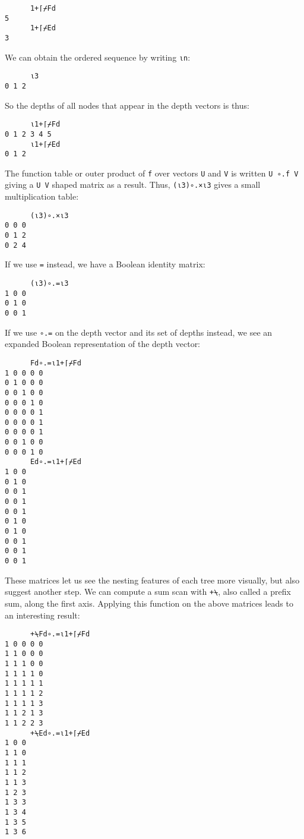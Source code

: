 \documentclass[numbers,preprint]{sigplanconf}
\begin{document}
\begin{verbatim}
      1+⌈⌿Fd
5
      1+⌈⌿Ed
3
\end{verbatim}

We can obtain the ordered sequence  by writing \verb;⍳n;:

\begin{verbatim}
      ⍳3
0 1 2
\end{verbatim}

So the depths of all nodes that appear in the depth vectors is thus:

\begin{verbatim}
      ⍳1+⌈⌿Fd
0 1 2 3 4 5
      ⍳1+⌈⌿Ed
0 1 2
\end{verbatim}

The function table or outer product of \verb;f; over vectors \verb;U; and \verb;V; is
written \verb;U ∘.f V; giving a \verb;U V; shaped matrix as a result. Thus,
\verb;(⍳3)∘.×⍳3; gives a small multiplication table:

\begin{verbatim}
      (⍳3)∘.×⍳3
0 0 0
0 1 2
0 2 4
\end{verbatim}

If we use \verb;=; instead, we have a Boolean identity matrix:

\begin{verbatim}
      (⍳3)∘.=⍳3
1 0 0
0 1 0
0 0 1
\end{verbatim}

If we use \verb;∘.=; on the depth vector and its set of depths instead,
we see an expanded Boolean representation of the depth vector:

\begin{verbatim}
      Fd∘.=⍳1+⌈⌿Fd
1 0 0 0 0
0 1 0 0 0
0 0 1 0 0
0 0 0 1 0
0 0 0 0 1
0 0 0 0 1
0 0 0 0 1
0 0 1 0 0
0 0 0 1 0
      Ed∘.=⍳1+⌈⌿Ed
1 0 0
0 1 0
0 0 1
0 0 1
0 0 1
0 1 0
0 1 0
0 0 1
0 0 1
0 0 1
\end{verbatim}

These matrices let us see the nesting features of each tree more
visually, but also suggest another step. We can compute a sum scan
with \verb;+⍀;, also called a prefix sum, along the first axis. Applying
this function on the above matrices leads to an interesting result:

\begin{verbatim}
      +⍀Fd∘.=⍳1+⌈⌿Fd
1 0 0 0 0
1 1 0 0 0
1 1 1 0 0
1 1 1 1 0
1 1 1 1 1
1 1 1 1 2
1 1 1 1 3
1 1 2 1 3
1 1 2 2 3
      +⍀Ed∘.=⍳1+⌈⌿Ed
1 0 0
1 1 0
1 1 1
1 1 2
1 1 3
1 2 3
1 3 3
1 3 4
1 3 5
1 3 6
\end{verbatim}
\end{document}
